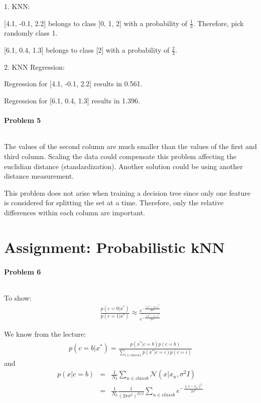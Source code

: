 \documentclass{article}
\begin{document}
1. KNN:

[4.1, -0.1,  2.2] belongs to class [0, 1, 2] with a probability of $\frac{1}{3}$. Therefore, pick randomly class 1.

[6.1,  0.4,  1.3] belongs to class [2] with a probability of $\frac{2}{3}$.

2. KNN Regression:

Regression for [4.1, -0.1,  2.2] results in 0.561.

Regression for [6.1,  0.4, 1.3] results in 1.396.

\paragraph*{Problem 5}
$\;$ 

The values of the second column are much smaller than the values of the first and third column. Scaling the data could compensate this problem affecting the euclidian distance (standardization). Another solution could be using another distance measurement.

This problem does not arise when training a decision tree since only one feature is considered for splitting the set at a time. Therefore, only the relative differences within each column are important.



\section{Assignment: Probabilistic kNN}
\paragraph*{Problem 6}
$\;$ 

To show:
\begin{eqnarray}
\frac{p(c=0|x^*)}{p(c=1|x^*)} \approx \frac{e^{-\frac{{\|x^*-x_0\|}^2}{2\sigma^2}}}{e^{-\frac{{\|x^*-x_1\|}^2}{2\sigma^2}}}
\end{eqnarray}

We know from the lecture:
\begin{eqnarray}
p(c = b|x^*) = \frac{p(x^*|c=b)p(c=b)}{\sum_{i \in classes}{p(x^*|c=i)p(c=i)}}
\end{eqnarray}
and
\begin{eqnarray}
p(x | c = b) &=& \frac{1}{N_b} \sum_{n \in class b}{\mathcal{N}(x | x_n, \sigma^2 I)}\\
&=& \frac{1}{N_b} \frac{1}{(2\pi \sigma^2)^{D/2}} \sum_{n \in class b}{e^{-\frac{\|x -x_n\|^2}{2 \sigma^2}}}
\end{eqnarray}
\end{document}
